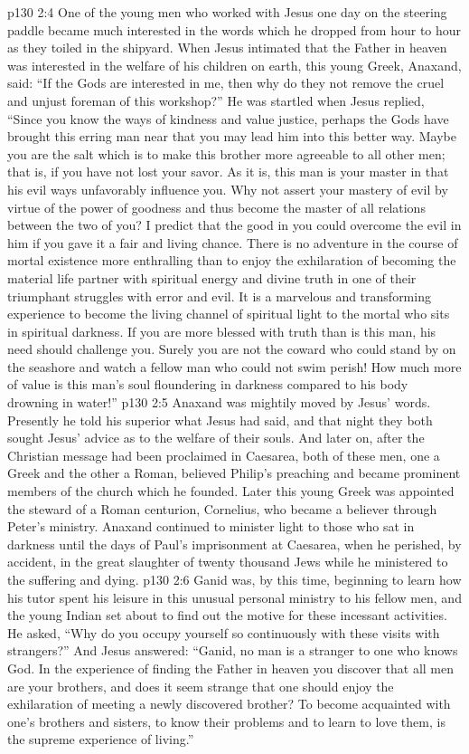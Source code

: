 \pc \vs p130 2:4 One of the young men who worked with Jesus one day on the steering paddle became much interested in the words which he dropped from hour to hour as they toiled in the shipyard. When Jesus intimated that the Father in heaven was interested in the welfare of his children on earth, this young Greek, Anaxand, said: “If the Gods are interested in me, then why do they not remove the cruel and unjust foreman of this workshop?” He was startled when Jesus replied, \textcolor{ubdarkred}{“Since you know the ways of kindness and value justice, perhaps the Gods have brought this erring man near that you may lead him into this better way. Maybe you are the salt which is to make this brother more agreeable to all other men; that is, if you have not lost your savor. As it is, this man is your master in that his evil ways unfavorably influence you. Why not assert your mastery of evil by virtue of the power of goodness and thus become the master of all relations between the two of you? I predict that the good in you could overcome the evil in him if you gave it a fair and living chance. There is no adventure in the course of mortal existence more enthralling than to enjoy the exhilaration of becoming the material life partner with spiritual energy and divine truth in one of their triumphant struggles with error and evil. It is a marvelous and transforming experience to become the living channel of spiritual light to the mortal who sits in spiritual darkness. If you are more blessed with truth than is this man, his need should challenge you. Surely you are not the coward who could stand by on the seashore and watch a fellow man who could not swim perish! How much more of value is this man’s soul floundering in darkness compared to his body drowning in water!”}
\vs p130 2:5 Anaxand was mightily moved by Jesus’ words. Presently he told his superior what Jesus had said, and that night they both sought Jesus’ advice as to the welfare of their souls. And later on, after the Christian message had been proclaimed in Caesarea, both of these men, one a Greek and the other a Roman, believed Philip’s preaching and became prominent members of the church which he founded. Later this young Greek was appointed the steward of a Roman centurion, Cornelius, who became a believer through Peter’s ministry. Anaxand continued to minister light to those who sat in darkness until the days of Paul’s imprisonment at Caesarea, when he perished, by accident, in the great slaughter of twenty thousand Jews while he ministered to the suffering and dying.
\pc \vs p130 2:6 Ganid was, by this time, beginning to learn how his tutor spent his leisure in this unusual personal ministry to his fellow men, and the young Indian set about to find out the motive for these incessant activities. He asked, “Why do you occupy yourself so continuously with these visits with strangers?” And Jesus answered: \textcolor{ubdarkred}{“Ganid, no man is a stranger to one who knows God. In the experience of finding the Father in heaven you discover that all men are your brothers, and does it seem strange that one should enjoy the exhilaration of meeting a newly discovered brother? To become acquainted with one’s brothers and sisters, to know their problems and to learn to love them, is the supreme experience of living.”}
